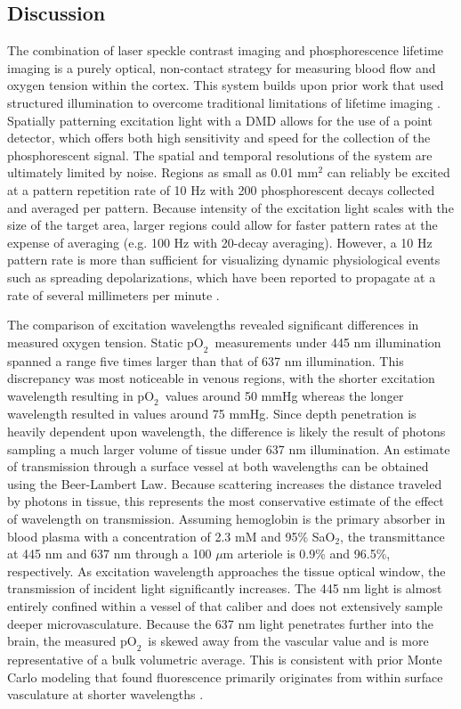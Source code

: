 \documentclass[12pt]{spieman}  %
\newcommand{\pO}{\ensuremath{\text{pO}_2}} 	            %
\begin{document}
\begin{spacing}{2}
\section{Discussion}
\label{sect:discussion}

The combination of laser speckle contrast imaging and phosphorescence lifetime imaging is a purely optical, non-contact strategy for measuring blood flow and oxygen tension within the cortex. This system builds upon prior work that used structured illumination to overcome traditional limitations of lifetime imaging \cite{Ponticorvo:2010uv}. Spatially patterning excitation light with a DMD allows for the use of a point detector, which offers both high sensitivity and speed for the collection of the phosphorescent signal. The spatial and temporal resolutions of the system are ultimately limited by noise. Regions as small as 0.01 mm$^{2}$ can reliably be excited at a pattern repetition rate of 10 Hz with 200 phosphorescent decays collected and averaged per pattern. Because intensity of the excitation light scales with the size of the target area, larger regions could allow for faster pattern rates at the expense of averaging (e.g. 100 Hz with 20-decay averaging). However, a 10 Hz pattern rate is more than sufficient for visualizing dynamic physiological events such as spreading depolarizations, which have been reported to propagate at a rate of several millimeters per minute \cite{Lauritzen:1994vs}.

The comparison of excitation wavelengths revealed significant differences in measured oxygen tension. Static \pO\ measurements under 445 nm illumination spanned a range five times larger than that of 637 nm illumination. This discrepancy was most noticeable in venous regions, with the shorter excitation wavelength resulting in \pO\ values around 50 mmHg whereas the longer wavelength resulted in values around 75 mmHg. Since depth penetration is heavily dependent upon wavelength\cite{Deng:2003kb}, the difference is likely the result of photons sampling a much larger volume of tissue under 637 nm illumination. An estimate of transmission through a surface vessel at both wavelengths can be obtained using the Beer-Lambert Law. Because scattering increases the distance traveled by photons in tissue, this represents the most conservative estimate of the effect of wavelength on transmission. Assuming hemoglobin is the primary absorber in blood plasma with a concentration of 2.3 mM \cite{Robles:2010cw} and 95\% SaO$_{2}$, the transmittance at 445 nm and 637 nm through a 100 $\mu$m arteriole is 0.9\% and 96.5\%, respectively. As excitation wavelength approaches the tissue optical window, the transmission of incident light significantly increases. The 445 nm light is almost entirely confined within a vessel of that caliber and does not extensively sample deeper microvasculature. Because the 637 nm light penetrates further into the brain, the measured \pO\ is skewed away from the vascular value and is more representative of a bulk volumetric average. This is consistent with prior Monte Carlo modeling that found fluorescence primarily originates from within surface vasculature at shorter wavelengths \cite{Davis:2011wj}.


\end{spacing}
\end{document}
